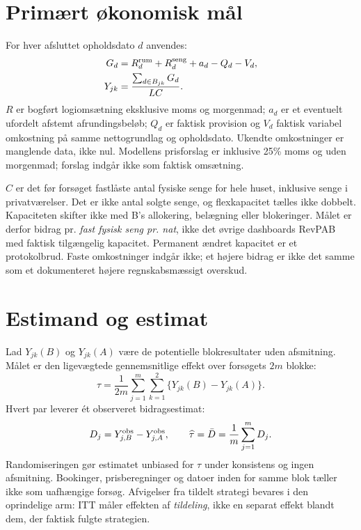 \documentclass[11pt,a4paper]{article}
\begin{document}
\section{Primært økonomisk mål}
For hver afsluttet opholdsdato $d$ anvendes:
\begin{align}
 G_d&=R_d^{\rm rum}+R_d^{\rm seng}+a_d-Q_d-V_d,\\
 Y_{jk}&=\frac{\sum_{d\in B_{jk}}G_d}{LC}.
\end{align}
$R$ er bogført logiomsætning eksklusive moms og morgenmad; $a_d$ er et eventuelt
ufordelt afstemt afrundingsbeløb; $Q_d$ er faktisk provision og $V_d$ faktisk
variabel omkostning på samme nettogrundlag og opholdsdato. Ukendte omkostninger
er manglende data, ikke nul. Modellens prisforslag er inklusive 25\% moms og
uden morgenmad; forslag indgår ikke som faktisk omsætning.

$C$ er det før forsøget fastlåste antal fysiske senge for hele huset, inklusive
senge i privatværelser. Det er ikke antal solgte senge, og flexkapacitet tælles
ikke dobbelt. Kapaciteten skifter ikke med B's allokering, belægning eller
blokeringer. Målet er derfor bidrag pr. \emph{fast fysisk seng pr. nat}, ikke det
øvrige dashboards RevPAB med faktisk tilgængelig kapacitet. Permanent ændret
kapacitet er et protokolbrud. Faste omkostninger indgår ikke; et højere bidrag er
ikke det samme som et dokumenteret højere regnskabsmæssigt overskud.

\section{Estimand og estimat}
Lad $Y_{jk}(B)$ og $Y_{jk}(A)$ være de potentielle blokresultater uden afsmitning.
Målet er den ligevægtede gennemsnitlige effekt over forsøgets $2m$ blokke:
\begin{equation}
 \tau=\frac{1}{2m}\sum_{j=1}^{m}\sum_{k=1}^{2}\{Y_{jk}(B)-Y_{jk}(A)\}.
\end{equation}
Hvert par leverer ét observeret bidragsestimat:
\begin{equation}
 D_j=Y_{j,B}^{\rm obs}-Y_{j,A}^{\rm obs},\qquad
 \widehat\tau=\bar D=\frac{1}{m}\sum_{j=1}^{m}D_j.
\end{equation}
Randomiseringen gør estimatet unbiased for $\tau$ under konsistens og ingen
afsmitning. Bookinger, prisberegninger og datoer inden for samme blok tæller
ikke som uafhængige forsøg. Afvigelser fra tildelt strategi bevares i den
oprindelige arm: ITT måler effekten af \emph{tildeling}, ikke en separat
effekt blandt dem, der faktisk fulgte strategien.
\end{document}
